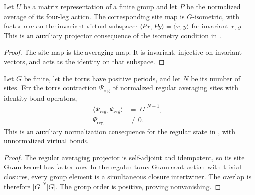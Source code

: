 \begin{lemma}%
    \label{thm:peps_averaging_site_isometry}
    \leanok
    Let $U$ be a matrix representation of a finite group and let $P$
    be the normalized average of its four-leg action. The corresponding
    site map is $G$-isometric, with factor one on the invariant virtual
    subspace: $\langle Px,Py\rangle=\langle x,y\rangle$ for invariant
    $x,y$. This is an auxiliary projector consequence of the isometry
    condition in \cite[Definition~6.1]{Schuch2010PEPS}.
\end{lemma}
\begin{proof}\leanok
    The site map is the averaging map. It is invariant, injective on
    invariant vectors, and acts as the identity on that subspace.
\end{proof}

\begin{lemma}%
    \label{thm:peps_regular_averaging_torus_norm}
    \leanok
    Let $G$ be finite, let the torus have positive periods, and let $N$
    be its number of sites. For the torus contraction
    $\Psi_{\mathrm{reg}}$ of normalized regular averaging sites with
    identity bond operators,
    \begin{align}
        \langle\Psi_{\mathrm{reg}},\Psi_{\mathrm{reg}}\rangle
                            & =|G|^{N+1}, \\
        \Psi_{\mathrm{reg}} & \ne0.
    \end{align}
    This is an auxiliary normalization consequence for the regular state
    in \cite[Section~7]{Schuch2010PEPS}, with unnormalized virtual bonds.
\end{lemma}
\begin{proof}\leanok
    The regular averaging projector is self-adjoint and idempotent,
    so its site Gram kernel has factor one.
    In the regular torus Gram contraction with trivial closures, every
    group element is a simultaneous closure intertwiner. The overlap is
    therefore $|G|^N|G|$. The group order is positive, proving nonvanishing.
\end{proof}

